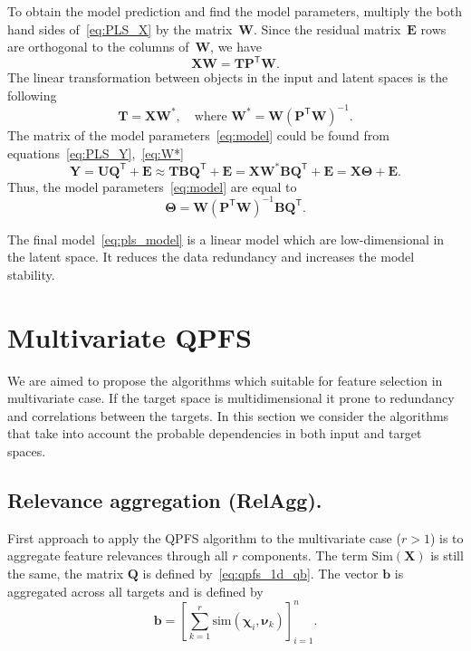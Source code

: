 \documentclass[12pt,oneside]{article}
\theoremstyle{definition}
\newcommand{\bb}{\mathbf{b}}
\newcommand{\bY}{\mathbf{Y}}
\newcommand{\bX}{\mathbf{X}}
\newcommand{\bP}{\mathbf{P}}
\newcommand{\bT}{\mathbf{T}}
\newcommand{\bB}{\mathbf{B}}
\newcommand{\bQ}{\mathbf{Q}}
\newcommand{\bE}{\mathbf{E}}
\newcommand{\bU}{\mathbf{U}}
\newcommand{\bW}{\mathbf{W}}
\newcommand{\T}{\mathsf{T}}
\newcommand{\bchi}{\boldsymbol{\chi}}
\newcommand{\bnu}{\boldsymbol{\nu}}
\newcommand{\bTheta}{\boldsymbol{\Theta}}
\begin{document}
To obtain the model prediction and find the model parameters, multiply the both hand sides of~\eqref{eq:PLS_X} by the matrix~$\bW$. 
Since the residual matrix~$\bE$ rows are orthogonal to the columns of~$\bW$, we have
\begin{equation}
\bX \bW = \bT \bP^{\T} \bW.
\end{equation}
The linear transformation between objects in the input and latent spaces is the following
\begin{equation}
\bT = \bX \bW^*, \quad \text{where } \bW^* = \bW (\bP^{\T} \bW)^{-1}.
\label{eq:W*}
\end{equation}
The matrix of the model parameters~\eqref{eq:model} could be found from equations~\eqref{eq:PLS_Y},~\eqref{eq:W*}
\begin{equation}
\bY = \bU \bQ^{\T} + \bE \approx \bT \bB \bQ^{\T}+ \bE = \bX \bW^* \bB \bQ^{\T} + \bE = \bX \bTheta + \bE.
\label{eq:pls_model}
\end{equation}
Thus, the model parameters~\eqref{eq:model} are equal to
\begin{equation}
\bTheta = \bW (\bP^{\T} \bW)^{-1} \bB \bQ^{\T}.
\label{eq:model_parameters}
\end{equation}

The final model~\eqref{eq:pls_model} is a linear model which are low-dimensional in the latent space. 
It reduces the data redundancy and increases the model stability. 

\newpage
\section{Multivariate QPFS}

We are aimed to propose the algorithms which suitable for feature selection in multivariate case. 
If the target space is multidimensional it prone to redundancy and correlations between the targets. 
In this section we consider the algorithms that take into account the probable dependencies in both input and target spaces.

\subsection{Relevance aggregation (RelAgg).}

First approach to apply the QPFS algorithm to the multivariate case ($r > 1$) is to aggregate feature relevances through all $r$ components. The term $\text{Sim}(\bX)$ is still the same, the matrix $\bQ$ is defined by~\eqref{eq:qpfs_1d_qb}. The vector $\bb$ is aggregated across all targets and is defined by
\begin{equation}
\bb = \left[\sum_{k=1}^r\text{sim}(\bchi_i, \bnu_k)\right]_{i=1}^n.
\end{equation}
\end{document}
